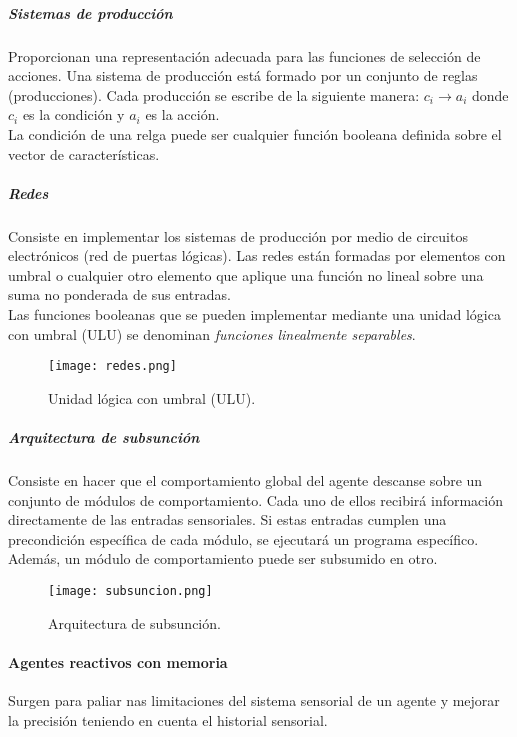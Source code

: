 \documentclass[12pt,spanish]{article}
\numberwithin{definition}{subsection}
\begin{document}
\subparagraph{Sistemas de producción}

Proporcionan una representación adecuada para las funciones de selección de acciones. Una sistema de producción está formado por un conjunto de reglas (producciones). Cada producción se escribe de la siguiente manera: $c_i \rightarrow a_i$ donde $c_i$ es la condición y $a_i$ es la acción.\\

La condición de una relga puede ser cualquier función booleana definida sobre el vector de características. 

\subparagraph{Redes}

Consiste en implementar los sistemas de producción por medio de circuitos electrónicos (red de puertas lógicas). Las redes están formadas por elementos con umbral o cualquier otro elemento que aplique una función no lineal sobre una suma no ponderada de sus entradas. \\

Las funciones booleanas que se pueden implementar mediante una unidad lógica con umbral (ULU) se denominan \emph{funciones linealmente separables}.

\begin{figure}
\centering
\texttt{[image: redes.png]}
\caption{Unidad lógica con umbral (ULU).}
\end{figure}

\subparagraph{Arquitectura de subsunción}

Consiste en hacer que el comportamiento global del agente descanse sobre un conjunto de módulos de comportamiento. Cada uno de ellos recibirá información directamente de las entradas sensoriales. Si estas entradas cumplen una precondición específica de cada módulo, se ejecutará un programa específico. Además, un módulo de comportamiento puede ser subsumido en otro.

\begin{figure}
\centering
\texttt{[image: subsuncion.png]}
\caption{Arquitectura de subsunción.}
\end{figure}

\paragraph{Agentes reactivos con memoria}

Surgen para paliar nas limitaciones del sistema sensorial de un agente y mejorar la precisión teniendo en cuenta el historial sensorial.\\
\end{document}
